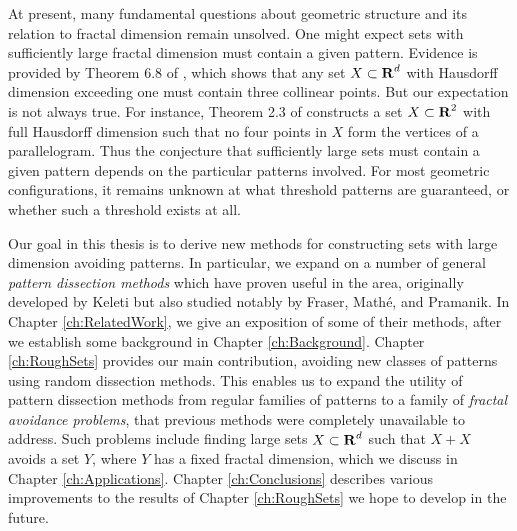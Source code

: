 At present, many fundamental questions about geometric structure and its relation to fractal dimension remain unsolved. One might expect sets with sufficiently large fractal dimension must contain a given pattern. Evidence is provided by Theorem 6.8 of \cite{Matilla}, which shows that any set $X \subset \operatorname{\mathbf{R}}^d$ with Hausdorff dimension exceeding one must contain three collinear points. But our expectation is not always true. For instance, Theorem 2.3 of \cite{Maga} constructs a set $X \subset \operatorname{\mathbf{R}}^2$ with full Hausdorff dimension such that no four points in $X$ form the vertices of a parallelogram. Thus the conjecture that sufficiently large sets must contain a given pattern depends on the particular patterns involved. For most geometric configurations, it remains unknown at what threshold patterns are guaranteed, or whether such a threshold exists at all.


Our goal in this thesis is to derive new methods for constructing sets with large dimension avoiding patterns. In particular, we expand on a number of general {\it pattern dissection methods} which have proven useful in the area, originally developed by Keleti but also studied notably by Fraser, Math\'{e}, and Pramanik. In Chapter \ref{ch:RelatedWork}, we give an exposition of some of their methods, after we establish some background in Chapter \ref{ch:Background}. Chapter \ref{ch:RoughSets} provides our main contribution, avoiding new classes of patterns using random dissection methods. This enables us to expand the utility of pattern dissection methods from regular families of patterns to a family of {\it fractal avoidance problems}, that previous methods were completely unavailable to address. Such problems include finding large sets $X \subset \operatorname{\mathbf{R}}^d$ such that $X + X$ avoids a set $Y$, where $Y$ has a fixed fractal dimension, which we discuss in Chapter \ref{ch:Applications}. Chapter \ref{ch:Conclusions} describes various improvements to the results of Chapter \ref{ch:RoughSets} we hope to develop in the future.

\endinput

Any text after an \endinput is ignored.
You could put scraps here or things in progress.
